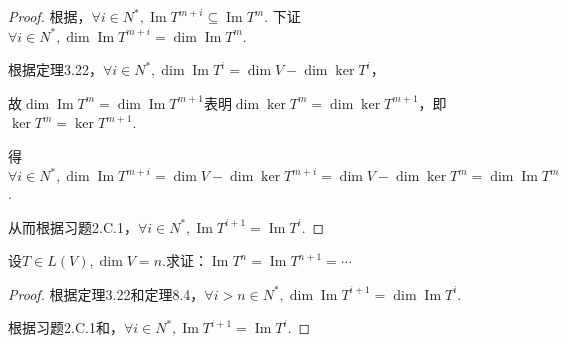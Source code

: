 \begin{proof}
    根据，\(\forall i \in N^*,\operatorname{Im} T^{m+i} \subseteq \operatorname{Im} T^m\).
    下证\(\forall i \in N^*,\dim \operatorname{Im} T^{m+i}=\dim \operatorname{Im} T^m\).
    
    根据定理3.22，\(\forall i \in N^*,\dim \operatorname{Im} T^i=\dim V-\dim \ker T^i\)，
    
    故\(\dim \operatorname{Im} T^m=\dim \operatorname{Im} T^{m+1}\)表明\(\dim \ker T^m=\dim \ker T^{m+1}\)，即\(\ker T^m =\ker T^{m+1}\).
    
    得\(\forall i \in N^*,\dim \operatorname{Im} T^{m+i}=\dim V-\dim \ker T^{m+i}=\dim V-\dim \ker T^m=\dim \operatorname{Im} T^m\).
    
    从而根据习题2.C.1，\(\forall i \in N^*,\operatorname{Im} T^{i+1}=\operatorname{Im} T^i\).
    
\end{proof}

\begin{problem}[18]\label{8.A.18}
    设\(T \in L(V),\dim V=n\).求证：\(\operatorname{Im} T^n=\operatorname{Im} T^{n+1}=\cdots\)
\end{problem}

\begin{proof}
    根据定理3.22和定理8.4，\(\forall i>n \in N^*,\dim \operatorname{Im} T^{i+1}=\dim \operatorname{Im} T^i\).

    根据习题2.C.1和，\(\forall i \in N^*,\operatorname{Im} T^{i+1}=\operatorname{Im} T^i\).
    
\end{proof}

